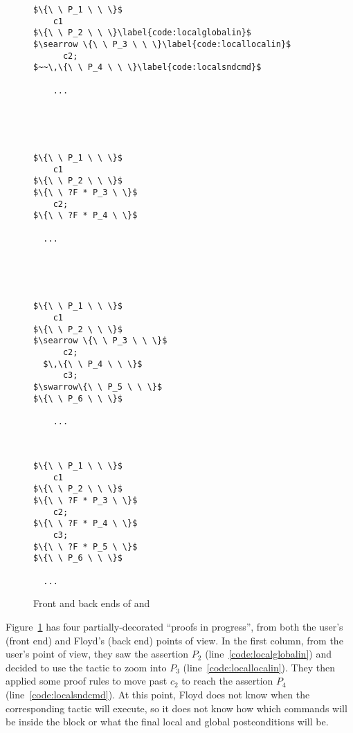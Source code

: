 \begin{figure}[t]
\begin{minipage}{.1\textwidth}
\begin{lstlisting}
$\{\ \ P_1 \ \ \}$
    c1
$\{\ \ P_2 \ \ \}\label{code:localglobalin}$
$\searrow \{\ \ P_3 \ \ \}\label{code:locallocalin}$
      c2;
$~~\,\{\ \ P_4 \ \ \}\label{code:localsndcmd}$

    ...



\end{lstlisting}
\end{minipage} \vline ~
\begin{minipage}{.11\textwidth}
\begin{lstlisting}[numbers=none]
$\{\ \ P_1 \ \ \}$
    c1
$\{\ \ P_2 \ \ \}$
$\{\ \ ?F * P_3 \ \}$
    c2;
$\{\ \ ?F * P_4 \ \}$

  ...



\end{lstlisting}
\end{minipage} \vline ~
\begin{minipage}{.11\textwidth}
\begin{lstlisting}[numbers=none]
$\{\ \ P_1 \ \ \}$
    c1
$\{\ \ P_2 \ \ \}$
$\searrow \{\ \ P_3 \ \ \}$
      c2;
  $\,\{\ \ P_4 \ \ \}$
      c3;
$\swarrow\{\ \ P_5 \ \ \}$
$\{\ \ P_6 \ \ \}$

    ...
\end{lstlisting}
\end{minipage} \vline ~
\begin{minipage}{.11\textwidth}
\begin{lstlisting}[numbers=none]
$\{\ \ P_1 \ \ \}$
    c1
$\{\ \ P_2 \ \ \}$
$\{\ \ ?F * P_3 \ \}$
    c2;
$\{\ \ ?F * P_4 \ \}$
    c3;
$\{\ \ ?F * P_5 \ \}$
$\{\ \ P_6 \ \ \}$

  ...
\end{lstlisting}
\end{minipage}
\caption{Front and back ends of  and }
\label{figure:backend}
\vspace{-2ex}
\end{figure}

Figure~\ref{figure:backend} has four partially-decorated ``proofs in progress'', from both the user's (front end) and Floyd's (back end) points of view.  In the first column, from the user's point of view, they saw the assertion $P_2$ (line~\ref{code:localglobalin}) and decided to use the  tactic to zoom into $P_3$ (line~\ref{code:locallocalin}).  They then applied some proof rules to move past $c_2$ to reach the assertion $P_4$ (line~\ref{code:localsndcmd}).  At this point, Floyd does not know when the corresponding  tactic will execute, so it does not know how which commands will be inside the block or what the final local and global postconditions will be.


